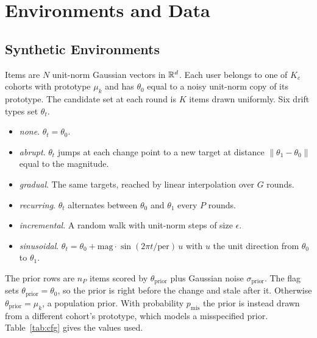 \section{Environments and Data}
\label{sec:env}

\subsection{Synthetic Environments}
Items are $N$ unit-norm Gaussian vectors in $\mathbb{R}^d$. Each user belongs to one of $K_c$ cohorts with prototype $\mu_k$ and has $\theta_0$ equal to a noisy unit-norm copy of its prototype. The candidate set at each round is $K$ items drawn uniformly. Six drift types set $\theta_t$.
\begin{itemize}
\item \emph{none}. $\theta_t=\theta_0$.
\item \emph{abrupt}. $\theta_t$ jumps at each change point to a new target at distance $\|\theta_1-\theta_0\|$ equal to the magnitude.
\item \emph{gradual}. The same targets, reached by linear interpolation over $G$ rounds.
\item \emph{recurring}. $\theta_t$ alternates between $\theta_0$ and $\theta_1$ every $P$ rounds.
\item \emph{incremental}. A random walk with unit-norm steps of size $\epsilon$.
\item \emph{sinusoidal}. $\theta_t=\theta_0+\text{mag}\cdot\sin(2\pi t/\text{per})\,u$ with $u$ the unit direction from $\theta_0$ to $\theta_1$.
\end{itemize}
The prior rows are $n_P$ items scored by $\theta_{\mathrm{prior}}$ plus Gaussian noise $\sigma_{\mathrm{prior}}$. The flag  sets $\theta_{\mathrm{prior}}=\theta_0$, so the prior is right before the change and stale after it. Otherwise $\theta_{\mathrm{prior}}=\mu_k$, a population prior. With probability $p_{\mathrm{mis}}$ the prior is instead drawn from a different cohort's prototype, which models a misspecified prior. Table~\ref{tab:cfg} gives the values used.

